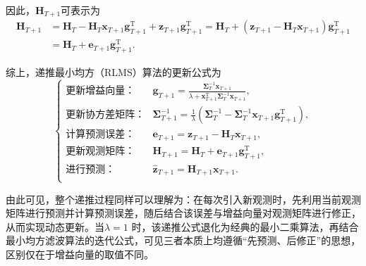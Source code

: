 因此，\( \mathbf{H}_{T+1} \)可表示为
\[
    \begin{split}
        \mathbf{H}_{T+1} & = \mathbf{H}_T - \mathbf{H}_T \bm{x}_{T+1} \bm{g}_{T+1}^{\mathrm{T}}  + \bm{z}_{T+1} \bm{g}_{T+1}^{\mathrm{T}} = \mathbf{H}_T + (\bm{z}_{T+1} - \mathbf{H}_T \bm{x}_{T+1}) \bm{g}_{T+1}^{\mathrm{T}} \\
                         & = \mathbf{H}_T + \bm{e}_{T+1} \bm{g}_{T+1}^{\mathrm{T}}.
    \end{split}
\]

综上，递推最小均方（RLMS）算法的更新公式为
\[
    \begin{cases}
        \text{更新增益向量：}  & \bm{g}_{T+1} = \frac{\mathbf{\Sigma}_T^{-1} \bm{x}_{T+1}}{\lambda + \bm{x}_{T+1}^\mathrm{T} \mathbf{\Sigma}_T^{-1} \bm{x}_{T+1}},                       \\
        \text{更新协方差矩阵：} & \mathbf{\Sigma}_{T+1}^{-1} = \frac{1}{\lambda} \left( \mathbf{\Sigma}_T^{-1} - \mathbf{\Sigma}_{T}^{-1} \bm{x}_{T+1} \bm{g}_{T+1}^{\mathrm{T}} \right), \\
        \text{计算预测误差：}  & \bm{e}_{T+1} = \bm{z}_{T+1} - \mathbf{H}_{T}\bm{x}_{T+1},                                                                                               \\
        \text{更新观测矩阵：}  & \mathbf{H}_{T+1} = \mathbf{H}_T + \bm{e}_{T+1} \bm{g}_{T+1}^{\mathrm{T}},                                                                               \\
        \text{进行预测：}    & \hat{\bm{z}}_{T+1} = \mathbf{H}_{T+1} \bm{x}_{T+1}.                                                                                                     \\
    \end{cases}
\]

由此可见，整个递推过程同样可以理解为：在每次引入新观测时，先利用当前观测矩阵进行预测并计算预测误差，随后结合该误差与增益向量对观测矩阵进行修正，从而实现动态更新。当\(  \lambda = 1 \) 时，该递推公式退化为经典的最小二乘算法，再结合最小均方滤波算法的迭代公式，可见三者本质上均遵循``先预测、后修正''的思想，区别仅在于增益向量的取值不同。

